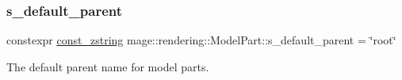 \subsubsection{\texorpdfstring{s\+\_\+default\+\_\+parent}{s\_default\_parent}}
{\footnotesize\ttfamily constexpr \mbox{\hyperlink{namespacemage_abfd9206dc607ceb5d13ec68bf075a5c0}{const\+\_\+zstring}} mage\+::rendering\+::\+Model\+Part\+::s\+\_\+default\+\_\+parent = \char`\"{}root\char`\"{}\hspace{0.3cm}{\ttfamily [static]}}

The default parent name for model parts. 